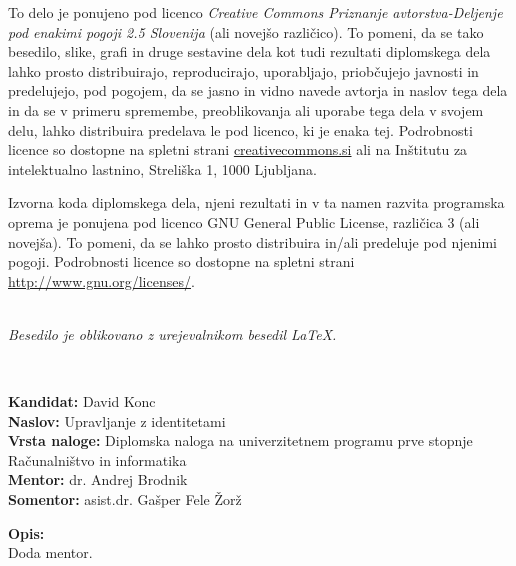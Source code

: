 \documentclass[a4paper,12pt,openright]{book}
\newcommand{\clearemptydoublepage}{\newpage{\pagestyle{empty}\cleardoublepage}}
\begin{document}
\newpage
\thispagestyle{empty}

\vspace*{5cm}
{\small \noindent
To delo je ponujeno pod licenco \textit{Creative Commons Priznanje avtorstva-Deljenje pod enakimi pogoji 2.5 Slovenija} (ali novej\v so razli\v cico).
To pomeni, da se tako besedilo, slike, grafi in druge sestavine dela kot tudi rezultati diplomskega dela lahko prosto distribuirajo,
reproducirajo, uporabljajo, priobčujejo javnosti in predelujejo, pod pogojem, da se jasno in vidno navede avtorja in naslov tega
dela in da se v primeru spremembe, preoblikovanja ali uporabe tega dela v svojem delu, lahko distribuira predelava le pod
licenco, ki je enaka tej.
Podrobnosti licence so dostopne na spletni strani \href{http://creativecommons.si}{creativecommons.si} ali na Inštitutu za
intelektualno lastnino, Streliška 1, 1000 Ljubljana.


\vspace*{1cm}
{\small \noindent
Izvorna koda diplomskega dela, njeni rezultati in v ta namen razvita programska oprema je ponujena pod licenco GNU General Public License,
različica 3 (ali novejša). To pomeni, da se lahko prosto distribuira in/ali predeluje pod njenimi pogoji.
Podrobnosti licence so dostopne na spletni strani \url{http://www.gnu.org/licenses/}.
}

\vfill
\begin{center} 
\ \\ \vfill
{\em
Besedilo je oblikovano z urejevalnikom besedil \LaTeX.}
\end{center}

\clearemptydoublepage

\thispagestyle{empty}
\
\vfill

\bigskip
\noindent\textbf{Kandidat:} David Konc\\
\noindent\textbf{Naslov:} Upravljanje z identitetami\\
\noindent\textbf{Vrsta naloge:} Diplomska naloga na univerzitetnem programu prve stopnje Računalništvo in informatika \\
\noindent\textbf{Mentor:} dr. Andrej Brodnik\\
\noindent\textbf{Somentor:} asist.dr. Gašper Fele Žorž

\bigskip
\noindent\textbf{Opis:}\\
Doda mentor.

}
\end{document}
